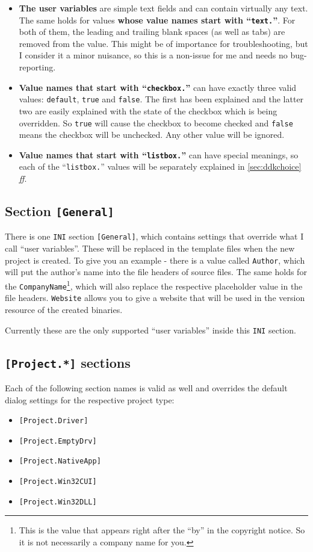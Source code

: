 \documentclass[a4paper,titlepage]{report}
\begin{document}
\begin{itemize}
  \item \textbf{The user variables} are simple text fields and can
contain virtually any text. The same holds for values \textbf{whose value names start with
``\texttt{text.}''}. For both of them, the leading and trailing blank spaces (as well
as tabs) are removed from the value. This might be of importance for troubleshooting,
but I consider it a minor nuisance, so this is a non-issue for me and needs no bug-reporting.

  \item \textbf{Value names that start with ``\texttt{checkbox.}''} can have exactly three valid values: \texttt{default},
\texttt{true} and \texttt{false}. The first has been explained and the latter two are
easily explained with the state of the checkbox which is being overridden. So \texttt{true}
will cause the checkbox to become checked and \texttt{false} means the checkbox will be unchecked.
Any other value will be ignored.

  \item \textbf{Value names that start with ``\texttt{listbox.}''} can have special meanings, so each
of the ``\texttt{listbox.}'' values will be separately explained in \autoref{sec:ddkchoice} \emph{ff}.
\end{itemize}

\subsection{Section \texttt{[General]}}\label{sec:authorandcompany}
There is one \texttt{INI} section \verb+[General]+, which contains settings that override what
I call ``user variables''. These will be replaced in the template files when the
new project is created. To give you an example - there is a value called \texttt{Author},
which will put the author's name into the file headers of source files. The same holds
for the \texttt{CompanyName}\footnote{This is the value that appears right after the ``by''
in the copyright notice. So it is not necessarily a company name for you.}, which will
also replace the respective placeholder value in the file headers. \texttt{Website}
allows you to give a website that will be used in the version resource of the created
binaries.

Currently these are the only supported ``user variables'' inside this \texttt{INI} section.

\subsection{\texttt{[Project.*]} sections}
Each of the following section names is valid as well and overrides the default dialog
settings for the respective project type:
\begin{itemize}
  \item \texttt{[Project.Driver]}
  \item \texttt{[Project.EmptyDrv]}
  \item \texttt{[Project.NativeApp]}
  \item \texttt{[Project.Win32CUI]}
  \item \texttt{[Project.Win32DLL]}
\end{itemize}
\end{document}
